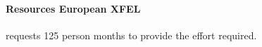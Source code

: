


\paragraph{Resources European XFEL}

 requests 125 person months to provide the effort required.

